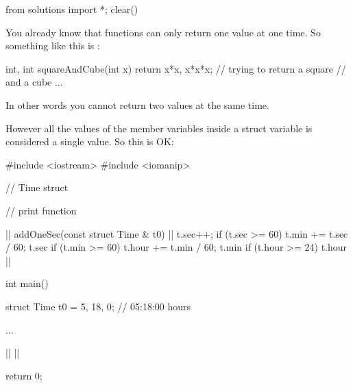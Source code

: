 \begin{python0}
from solutions import *; clear()
\end{python0}

You already know that functions can only return one value at one time.
So something like this is :

\begin{consolethree}[escapeinside=||]
int, int squareAndCube(int x)
{
  return x*x, x*x*x; // trying to return a square
                     // and a cube ...
}
\end{consolethree}

In other words you cannot return two values at the same time.

However all the values of the member variables inside a struct variable is
considered a single value. So this is OK:

\begin{consolethree}[escapeinside=||]
#include <iostream>
#include <iomanip>

// Time struct

// print function

|| addOneSec(const struct Time & t0)
{
  ||
  t.sec++;
  if (t.sec >= 60)
  {
    t.min += t.sec / 60;
    t.sec %
    if (t.min >= 60)
    {
      t.hour += t.min / 60;
      t.min %
      if (t.hour >= 24)
      {
        t.hour %
      }
    }
  }
  ||
}

int main()
{
  struct Time t0 = {5, 18, 0}; // 05:18:00 hours

  ...

  ||
  ||

  return 0;
}
\end{consolethree}





